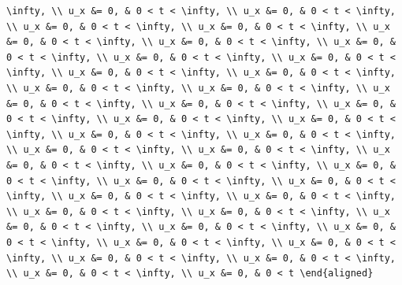 \documentclass[
  ukrainian,
]{article}
\begin{document}
\begin{verbatim}
\infty, \\ u_x &= 0, & 0 < t < \infty, \\ u_x &= 0, & 0 < t < \infty, \\ u_x &= 0, & 0 < t < \infty, \\ u_x &= 0, & 0 < t < \infty, \\ u_x &= 0, & 0 < t < \infty, \\ u_x &= 0, & 0 < t < \infty, \\ u_x &= 0, & 0 < t < \infty, \\ u_x &= 0, & 0 < t < \infty, \\ u_x &= 0, & 0 < t < \infty, \\ u_x &= 0, & 0 < t < \infty, \\ u_x &= 0, & 0 < t < \infty, \\ u_x &= 0, & 0 < t < \infty, \\ u_x &= 0, & 0 < t < \infty, \\ u_x &= 0, & 0 < t < \infty, \\ u_x &= 0, & 0 < t < \infty, \\ u_x &= 0, & 0 < t < \infty, \\ u_x &= 0, & 0 < t < \infty, \\ u_x &= 0, & 0 < t < \infty, \\ u_x &= 0, & 0 < t < \infty, \\ u_x &= 0, & 0 < t < \infty, \\ u_x &= 0, & 0 < t < \infty, \\ u_x &= 0, & 0 < t < \infty, \\ u_x &= 0, & 0 < t < \infty, \\ u_x &= 0, & 0 < t < \infty, \\ u_x &= 0, & 0 < t < \infty, \\ u_x &= 0, & 0 < t < \infty, \\ u_x &= 0, & 0 < t < \infty, \\ u_x &= 0, & 0 < t < \infty, \\ u_x &= 0, & 0 < t < \infty, \\ u_x &= 0, & 0 < t < \infty, \\ u_x &= 0, & 0 < t < \infty, \\ u_x &= 0, & 0 < t < \infty, \\ u_x &= 0, & 0 < t < \infty, \\ u_x &= 0, & 0 < t < \infty, \\ u_x &= 0, & 0 < t < \infty, \\ u_x &= 0, & 0 < t < \infty, \\ u_x &= 0, & 0 < t < \infty, \\ u_x &= 0, & 0 < t < \infty, \\ u_x &= 0, & 0 < t < \infty, \\ u_x &= 0, & 0 < t \end{aligned}
\end{verbatim}
\end{document}

